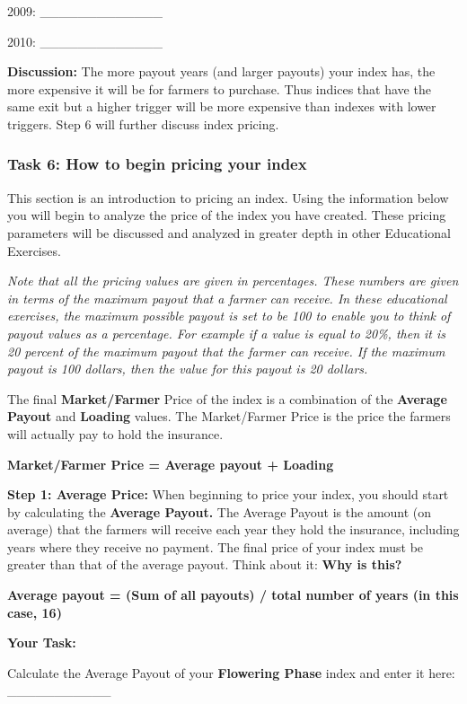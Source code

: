 \documentclass[letterpaper,10pt,english]{sphinxmanual}
\begin{document}
2009: \_\_\_\_\_\_\_\_\_\_\_\_\_

2010: \_\_\_\_\_\_\_\_\_\_\_\_\_

\textbf{Discussion:}
The more payout years (and larger payouts) your index has, the more expensive it will be for farmers to purchase. Thus indices that have the same exit but a higher trigger will be more expensive than indexes with lower triggers. Step 6 will further discuss index pricing.


\subsubsection{Task 6: How to begin pricing your index}
\label{whatisindexinsurance/designingindexbyhand:task-6-how-to-begin-pricing-your-index}
This section is an introduction to pricing an index. Using the information below you will begin to analyze the price of the index you have created. These pricing parameters will be discussed and analyzed in greater depth in other Educational Exercises.

\emph{Note that all the pricing values are given in percentages. These numbers are given in terms of the maximum payout that a farmer can receive. In these educational exercises, the maximum possible payout is set to be 100 to enable you to think of payout values as a percentage. For example if a value is equal to 20\%, then it is 20 percent of the maximum payout that the farmer can receive. If the maximum payout is 100 dollars, then the value for this payout is 20 dollars.}

The final \textbf{Market/Farmer} Price of the index is a combination of the \textbf{Average Payout} and \textbf{Loading} values. The Market/Farmer Price is the price the farmers will actually pay to hold the insurance.

\textbf{Market/Farmer Price = Average payout + Loading}

\textbf{Step 1: Average Price:} When beginning to price your index, you should start by calculating the \textbf{Average Payout.} The Average Payout is the amount (on average) that the farmers will receive each year they hold the insurance, including years where they receive no payment. The final price of your index must be greater than that of the average payout.  Think about it: \textbf{Why is this?}

\textbf{Average payout = (Sum of all payouts) / total number of years (in this case, 16)}

\textbf{Your Task:}

Calculate the Average Payout of your \textbf{Flowering Phase} index and enter it here: \_\_\_\_\_\_\_\_\_\_\_
\end{document}
